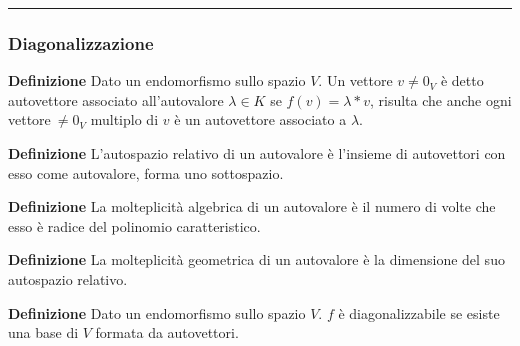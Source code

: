 \documentclass{article}
\begin{document}
\noindent\rule{\textwidth}{0.5pt}

\subsubsection{Diagonalizzazione}

\noindent\textbf{Definizione} Dato un endomorfismo sullo spazio $V$. Un vettore $v\neq0_V$ è detto autovettore associato all'autovalore $\lambda\in K$ se $f(v)=\lambda*v$, risulta che anche ogni vettore$\ \neq0_V$ multiplo di $v$ è un autovettore associato a $\lambda$.\newline

\noindent\textbf{Definizione} L'autospazio relativo di un autovalore è l'insieme di autovettori con esso come autovalore, forma uno sottospazio.\newline

\noindent\textbf{Definizione} La molteplicità algebrica di un autovalore è il numero di volte che esso è radice del polinomio caratteristico.\newline

\noindent\textbf{Definizione} La molteplicità geometrica di un autovalore è la dimensione del suo autospazio relativo.\newline

\noindent\textbf{Definizione} Dato un endomorfismo sullo spazio $V$. $f$ è diagonalizzabile se esiste una base di $V$ formata da autovettori.\newline
\end{document}
